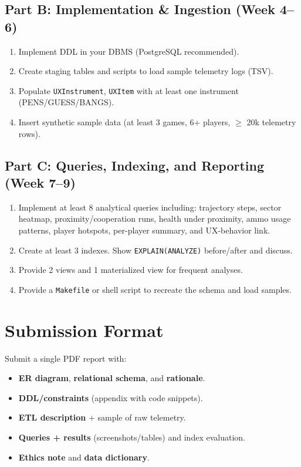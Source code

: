 \documentclass[11pt]{article}
\begin{document}
\subsection*{Part B: Implementation \& Ingestion (Week 4--6)}
\begin{enumerate}[leftmargin=*]
  \item Implement DDL in your DBMS (PostgreSQL recommended).
  \item Create staging tables and scripts to load sample telemetry logs (TSV).
  \item Populate \texttt{UXInstrument}, \texttt{UXItem} with at least one instrument (PENS/GUESS/BANGS).
  \item Insert synthetic sample data (at least 3 games, 6+ players, $\geq$ 20k telemetry rows).
\end{enumerate}

\subsection*{Part C: Queries, Indexing, and Reporting (Week 7--9)}
\begin{enumerate}[leftmargin=*]
  \item Implement at least 8 analytical queries including: trajectory steps, sector heatmap,
        proximity/cooperation runs, health under proximity, ammo usage patterns, player hotspots,
        per-player summary, and UX-behavior link.
  \item Create at least 3 indexes. Show \texttt{EXPLAIN(ANALYZE)} before/after and discuss.
  \item Provide 2 views and 1 materialized view for frequent analyses.
  \item Provide a \texttt{Makefile} or shell script to recreate the schema and load samples.
\end{enumerate}

\section{Submission Format}

Submit a single PDF report with:
\begin{itemize}[leftmargin=*]
  \item \textbf{ER diagram}, \textbf{relational schema}, and \textbf{rationale}.
  \item \textbf{DDL/constraints} (appendix with code snippets).
  \item \textbf{ETL description} + sample of raw telemetry.
  \item \textbf{Queries + results} (screenshots/tables) and index evaluation.
  \item \textbf{Ethics note} and \textbf{data dictionary}.
\end{itemize}
\end{document}
